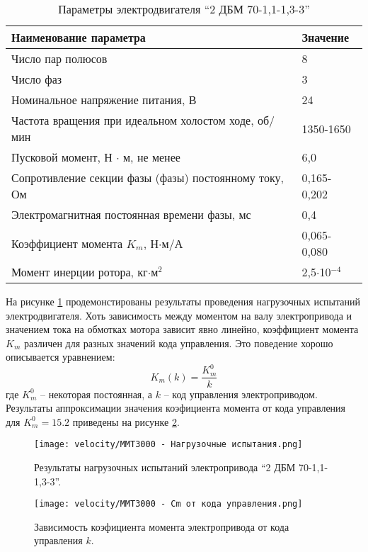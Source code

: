 \begin{table}
    \caption{Параметры электродвигателя ``2 ДБМ 70-1,1-1,3-3'' }\label{tab:mmt300_motor}
    \centering
    \begin{tabular}{ll}
        \toprule
        Наименование параметра  & Значение\\
        \midrule
        Число пар полюсов & 8 \\
        Число фаз & 3 \\
        Номинальное напряжение питания, В   & 24 \\
        Частота вращения при идеальном холостом ходе, об/мин & 1350-1650 \\
        Пусковой момент, Н $\cdot$ м, не менее      & 6,0 \\
        Сопротивление секции фазы (фазы) постоянному току, Ом & 0,165-0,202 \\
        Электромагнитная постоянная времени фазы, мс & 0,4 \\
        Коэффициент момента $K_m$, Н$\cdot$м/А   & 0,065-0,080   \\
        Момент инерции ротора, кг$\cdot$м$^2$   & 2,5$\cdot$10$^{-4}$ \\
        \bottomrule
    \end{tabular}
\end{table}
На рисунке \ref{fig:motor_load_test} продемонстированы результаты проведения нагрузочных испытаний электродвигателя.
Хоть зависимость между моментом на валу электропривода и значением тока на обмотках мотора зависит явно линейно, коэффициент момента $K_m$ различен для разных значений кода управления.
Это поведение хорошо описывается уравнением:
\begin{equation*}
    K_m(k) = \frac{K_m^0}{k}
\end{equation*}
\noindent где $K_m^0$ -- некоторая постоянная, а $k$ -- код управления электроприводом.
Результаты аппроксимации значения коэфициента момента от кода управления для $K_m^0 = 15.2$ приведены на рисунке \ref{fig:function_cm}.

\begin{figure}[ht]
    \centering
    \texttt{[image: velocity/MMT3000 - Нагрузочные испытания.png]}
    \caption{Результаты нагрузочных испытаний электропривода ``2 ДБМ 70-1,1-1,3-3''.}
    \label{fig:motor_load_test}
\end{figure}

\begin{figure}[ht]
    \centering
    \texttt{[image: velocity/MMT3000 - Cm от кода управления.png]}
    \caption{Зависимость коэфициента момента электропривода от кода управления $k$.}
    \label{fig:function_cm}
\end{figure}


